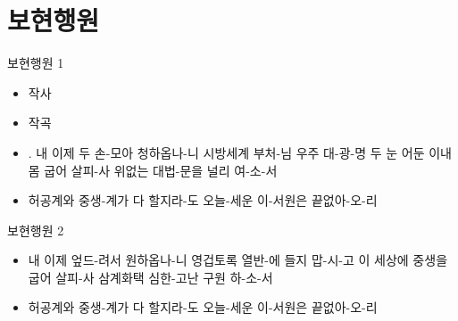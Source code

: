 \documentclass[aspectratio=1610,17pt,xcolor=pdftex,dvipsnames,table,handout]{beamer}
\begin{document}
		

		\section{ 보현행원 }
		

		\begin{frame} [t,plain]
			\begin{block} { 보현행원 1}

			\setlength{\leftmargini}{2em}			
			\begin{itemize}
				\item 작사
				\item 작곡
				\item . 내 이제 두 손-모아 청하옵나-니
시방세계 부처-님 우주 대-광-명
두 눈 어둔 이내몸 굽어 살피-사
위없는 대법-문을 널리 여-소-서

				\item 허공계와 중생-계가 다 할지라-도
오늘-세운 이-서원은 끝없아-오-리

			\end{itemize}
			
			\end{block}

		\end{frame} 	%


		\begin{frame} [t,plain]
			\begin{block} { 보현행원 2}

			\setlength{\leftmargini}{2em}			
			\begin{itemize}
				\item  내 이제 엎드-려서 원하옵나-니
영겁토록 열반-에 들지 맙-시-고
이 세상에 중생을 굽어 살피-사
삼계화택 심한-고난 구원 하-소-서

				\item 허공계와 중생-계가 다 할지라-도
오늘-세운 이-서원은 끝없아-오-리
			\end{itemize}
			
			\end{block}

		\end{frame} 	%
		

\end{document}
